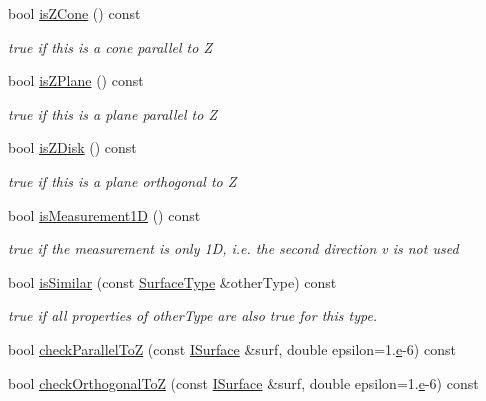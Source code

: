 \begin{DoxyCompactItemize}
bool \hyperlink{class_d_d_surfaces_1_1_surface_type_adfc3a03efefec5734e96647ad38be341}{is\+Z\+Cone} () const
\begin{DoxyCompactList}\small\item\em true if this is a cone parallel to Z \end{DoxyCompactList}\item 
bool \hyperlink{class_d_d_surfaces_1_1_surface_type_a425b616b625d4f5d6ebceba38cbb7c0c}{is\+Z\+Plane} () const
\begin{DoxyCompactList}\small\item\em true if this is a plane parallel to Z \end{DoxyCompactList}\item 
bool \hyperlink{class_d_d_surfaces_1_1_surface_type_af681afe8bbb11a18a888280b36551897}{is\+Z\+Disk} () const
\begin{DoxyCompactList}\small\item\em true if this is a plane orthogonal to Z \end{DoxyCompactList}\item 
bool \hyperlink{class_d_d_surfaces_1_1_surface_type_adb0556d602e0ef8ed33d88a4fd731375}{is\+Measurement1D} () const
\begin{DoxyCompactList}\small\item\em true if the measurement is only 1D, i.\+e. the second direction v is not used \end{DoxyCompactList}\item 
bool \hyperlink{class_d_d_surfaces_1_1_surface_type_aa4ac4b76c8fe761059f536e32ca58eaf}{is\+Similar} (const \hyperlink{class_d_d_surfaces_1_1_surface_type}{Surface\+Type} \&other\+Type) const
\begin{DoxyCompactList}\small\item\em true if all properties of other\+Type are also true for this type. \end{DoxyCompactList}\item 
bool \hyperlink{class_d_d_surfaces_1_1_surface_type_a0e8804669d1af234d9e268e3f13abd10}{check\+Parallel\+ToZ} (const \hyperlink{class_d_d_surfaces_1_1_i_surface}{I\+Surface} \&surf, double epsilon=1.\hyperlink{_volumes_8cpp_a8a9a1f93e9b09afccaec215310e64142}{e}-\/6) const
\item 
bool \hyperlink{class_d_d_surfaces_1_1_surface_type_abf3423898ff75a4641977341f09b5f7e}{check\+Orthogonal\+ToZ} (const \hyperlink{class_d_d_surfaces_1_1_i_surface}{I\+Surface} \&surf, double epsilon=1.\hyperlink{_volumes_8cpp_a8a9a1f93e9b09afccaec215310e64142}{e}-\/6) const
\end{DoxyCompactItemize}
